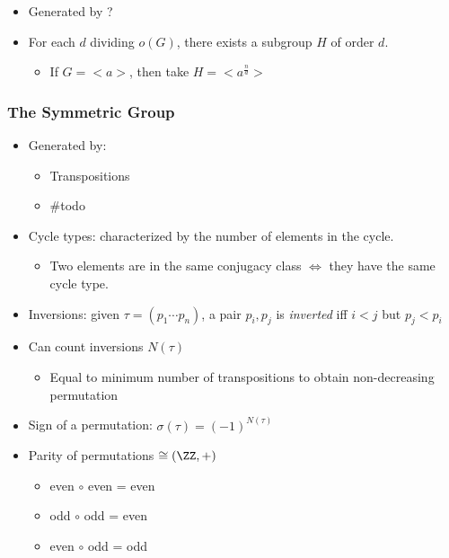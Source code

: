 \begin{itemize}
\tightlist
\item
  Generated by ?
\item
  For each \(d\) dividing \(o(G)\), there exists a subgroup \(H\) of
  order \(d\).

  \begin{itemize}
  \tightlist
  \item
    If \(G = <a>\), then take \(H = <a^{\frac{n}{d}}>\)
  \end{itemize}
\end{itemize}

\hypertarget{the-symmetric-group}{%
\subsubsection{The Symmetric Group}\label{the-symmetric-group}}

\begin{itemize}
\tightlist
\item
  Generated by:

  \begin{itemize}
  \tightlist
  \item
    Transpositions
  \item
    \#todo
  \end{itemize}
\item
  Cycle types: characterized by the number of elements in the cycle.

  \begin{itemize}
  \tightlist
  \item
    Two elements are in the same conjugacy class \(\iff\) they have the
    same cycle type.
  \end{itemize}
\item
  Inversions: given \(\tau = (p_1 \cdots p_n)\), a pair \(p_i, p_j\) is
  \emph{inverted} iff \(i < j\) but \(p_j < p_i\)
\item
  Can count inversions \(N(\tau)\)

  \begin{itemize}
  \tightlist
  \item
    Equal to minimum number of transpositions to obtain non-decreasing
    permutation
  \end{itemize}
\item
  Sign of a permutation: \(\sigma(\tau) = (-1)^{N(\tau)}\)
\item
  Parity of permutations \(\cong (\ZZ, +)\)

  \begin{itemize}
  \tightlist
  \item
    even \(\circ\) even = even
  \item
    odd \(\circ\) odd = even
  \item
    even \(\circ\) odd = odd
  \end{itemize}
\end{itemize}

